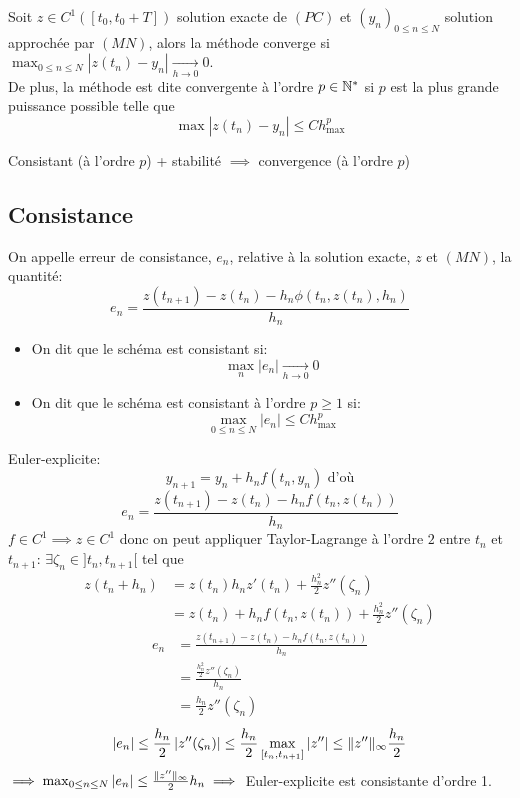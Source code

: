 \documentclass[]{report}
\begin{document}
    \begin{df}{}{}
        Soit $z\in C^1([t_0,t_0+T])$ solution exacte de $(PC)$ et $(y_n)_{0\le n\le N}$ solution approchée par $(MN)$, alors la méthode converge si $\max_{0\le n\le N}\left|z(t_n)-y_n\right|\underset{h\to 0}{\longrightarrow}0$.\\
        De plus, la méthode est dite convergente à l'ordre $p\in \mathbb{N}^*$ si $p$ est la plus grande puissance possible telle que
        \[\max |z(t_n)-y_n|\le C h_{\max}^p\]
    \end{df}

    \begin{tm}{}{}
        Consistant (à l'ordre $p$) + stabilité $\implies$ convergence (à l'ordre $p$)
    \end{tm}

    \subsection{Consistance}

    \begin{df}{}{}
        On appelle erreur de consistance, $e_n$, relative à la solution exacte, $z$ et $(MN)$, la quantité:
        \[e_n=\frac{z(t_{n+1})-z(t_n)-h_n\phi(t_n,z(t_n),h_n)}{h_n}\]
        \begin{itemize}
        \item On dit que le schéma est consistant si:
        \[\max_{n}\left|e_n\right|\underset{h\to 0}{\longrightarrow}0\]
        \item On dit que le schéma est consistant à l'ordre $p\ge 1$ si:
        \[\max_{0\le n\le N}\left|e_n\right|\le C h_{\max}^p\]
        \end{itemize}
    \end{df}

    \begin{ex}{}{}
        Euler-explicite:
        \[y_{n+1}= y_n +h_n f(t_n,y_n)\text{ d'où}\]
        \[e_n=\frac{z(t_{n+1})-z(t_n)-h_n f(t_n,z(t_n))}{h_n}\]
        $f\in C^1\implies z\in C^1$ donc on peut appliquer Taylor-Lagrange à l'ordre $2$ entre $t_n$ et $t_{n+1}$: $\exists \zeta_n\in ]t_n,t_{n+1}[$ tel que
        \begin{align*}
            z(t_n+h_n)&=z(t_n)h_nz'(t_n)+\frac{h_n^2}{2}z''(\zeta_n)\\
            &=z(t_n)+h_n f(t_n,z(t_n))+\frac{h_n^2}{2}z''(\zeta_n)
        \end{align*}
        \begin{align*}
            e_n&=\frac{z(t_{n+1})-z(t_n)-h_n f(t_n,z(t_n))}{h_n}\\
            &=\frac{\frac{h_n^2}{2}z''(\zeta_n)}{h_n}\\
            &=\frac{h_n}{2}z''(\zeta_n)
        \end{align*}
        \[\left|e_n\right|\le \frac{h_n}{2}\left|z''(\zeta_n)\right|\le \frac{h_n}{2}\max_{[t_n,t_{n+1}]}\left|z''\right|\le \lVert z'' \rVert_\infty \frac{h_n}{2}\]
        $\implies \max_{0\le n\le N}\left|e_n\right|\le \frac{\lVert z'' \rVert_\infty}{2}h_n \implies $ Euler-explicite est consistante d'ordre 1.
    \end{ex}
\end{document}
